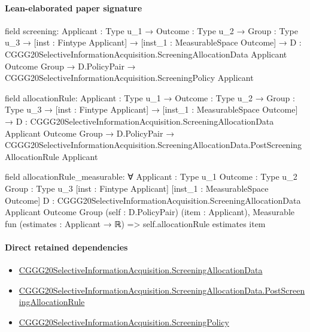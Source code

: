 \documentclass[10pt]{article}
\begin{document}
\paragraph{Lean-elaborated paper signature}
\begin{ReviewVerbatim}
field screening:
{Applicant : Type u_1} →
  {Outcome : Type u_2} →
    {Group : Type u_3} →
      [inst : Fintype Applicant] →
        [inst_1 : MeasurableSpace Outcome] →
          {D : CGGG20SelectiveInformationAcquisition.ScreeningAllocationData Applicant Outcome Group} →
            D.PolicyPair → CGGG20SelectiveInformationAcquisition.ScreeningPolicy Applicant

field allocationRule:
{Applicant : Type u_1} →
  {Outcome : Type u_2} →
    {Group : Type u_3} →
      [inst : Fintype Applicant] →
        [inst_1 : MeasurableSpace Outcome] →
          {D : CGGG20SelectiveInformationAcquisition.ScreeningAllocationData Applicant Outcome Group} →
            D.PolicyPair →
              CGGG20SelectiveInformationAcquisition.ScreeningAllocationData.PostScreeningAllocationRule Applicant

field allocationRule_measurable:
∀ {Applicant : Type u_1} {Outcome : Type u_2} {Group : Type u_3} [inst : Fintype Applicant]
  [inst_1 : MeasurableSpace Outcome]
  {D : CGGG20SelectiveInformationAcquisition.ScreeningAllocationData Applicant Outcome Group} (self : D.PolicyPair)
  (item : Applicant), Measurable fun (estimates : Applicant → ℝ) => self.allocationRule estimates item
\end{ReviewVerbatim}

\paragraph{Direct retained dependencies}
\begin{itemize}\raggedright
\item \hyperlink{paper-prerequisite-f3c5f56c4a8e4ac3}{CGGG20\allowbreak{}Selective\allowbreak{}Information\allowbreak{}Acquisition.\allowbreak{}Screening\allowbreak{}Allocation\allowbreak{}Data}
\item \hyperlink{governing-declaration-f9eddc2e17b937ab}{CGGG20\allowbreak{}Selective\allowbreak{}Information\allowbreak{}Acquisition.\allowbreak{}Screening\allowbreak{}Allocation\allowbreak{}Data.\allowbreak{}Post\allowbreak{}Screening\allowbreak{}Allocation\allowbreak{}Rule}
\item \hyperlink{paper-prerequisite-88f67c493873ffe9}{CGGG20\allowbreak{}Selective\allowbreak{}Information\allowbreak{}Acquisition.\allowbreak{}Screening\allowbreak{}Policy}
\end{itemize}
\end{document}
